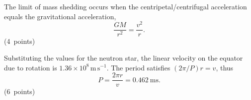The limit of mass shedding occurs when the centripetal/centrifugal acceleration equals the gravitational acceleration,
\[
\frac{GM}{r^2}=\frac{v^2}{r}.
\]
\hfill\mbox{(4 points)}

Substituting the values for the neutron star, the linear velocity on the equator due to rotation is
$1.36\times10^8\,\mathrm{m\,s^{-1}}$. The period satisfies $(2\pi/P)r=v$, thus
\[
P=\frac{2\pi r}{v}=0.462\ \mathrm{ms}.
\]
\hfill\mbox{(6 points)}
